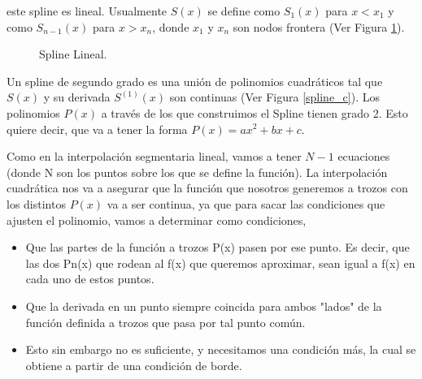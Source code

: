 \vspace{0.5cm}

\noindent este spline es lineal. Usualmente $S(x)$ se define como $S_{1}(x)$ para $x<x_{1}$ y como $S_{n-1}(x)$ para $x>x_{n}$, donde $x_{1}$ y $x_{n}$ son nodos frontera (Ver Figura \ref{spline_l}).


\begin{figure}[h]
\caption{Spline Lineal.}
\label{spline_l}
\end{figure}


\hspace{0.4cm} Un spline de segundo grado es una uni\'on de polinomios cuadr\'aticos tal que $S(x)$ y su derivada $S^{(1)}(x)$ son continuas (Ver Figura \ref{spline_c}). Los polinomios $P(x)$ a trav\'es de los que construimos el Spline tienen grado 2. Esto quiere decir, que va a tener la forma $P(x) = ax^2 + bx + c$.

\hspace{0.4cm} Como en la interpolaci\'on segmentaria lineal, vamos a tener $N-1$ ecuaciones (donde N son los puntos sobre los que se define la funci\'on). La interpolaci\'on cuadr\'atica nos va a asegurar que la funci\'on que nosotros generemos a trozos con los distintos $P(x)$ va a ser continua, ya que para sacar las condiciones que ajusten el polinomio, vamos a determinar como condiciones,

\begin{itemize}
  \item Que las partes de la funci\'on a trozos P(x) pasen por ese punto. Es decir, que las dos Pn(x) que rodean al f(x) que queremos aproximar, sean igual a f(x) en cada uno de estos puntos.
  \item Que la derivada en un punto siempre coincida para ambos "lados" de la funci\'on definida a trozos que pasa por tal punto com\'un.
  \item Esto sin embargo no es suficiente, y necesitamos una condici\'on m\'as, la cual se obtiene a partir de una condici\'on de borde.
\end{itemize}



